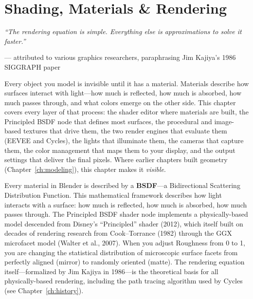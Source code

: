 
\chapter{Shading, Materials \& Rendering}
\label{ch:shading}

\begin{quotebox}
\itshape ``The rendering equation is simple. Everything else is
approximations to solve it faster.''

\upshape --- attributed to various graphics researchers,
paraphrasing Jim Kajiya's 1986 SIGGRAPH paper
\end{quotebox}

\vspace{1em}
Every object you model is invisible until it has a material.
Materials describe how surfaces interact with light---how much is
reflected, how much is absorbed, how much passes through, and what
colors emerge on the other side. This chapter covers every layer of
that process: the shader editor where materials are built, the
Principled BSDF node that defines most surfaces, the procedural and
image-based textures that drive them, the two render engines that
evaluate them (EEVEE and Cycles), the lights that illuminate them,
the cameras that capture them, the color management that maps them
to your display, and the output settings that deliver the final
pixels. Where earlier chapters built geometry
(Chapter~\ref{ch:modeling}), this chapter makes it \emph{visible}.

\begin{historynote}
Every material in Blender is described by a \textbf{BSDF}---a
Bidirectional Scattering Distribution Function. This mathematical
framework describes how light interacts with a surface: how much is
reflected, how much is absorbed, how much passes through. The
Principled BSDF shader node implements a physically-based model
descended from Disney's ``Principled'' shader (2012), which itself
built on decades of rendering research from Cook--Torrance (1982)
through the GGX microfacet model (Walter et al., 2007). When you
adjust Roughness from 0 to 1, you are changing the statistical
distribution of microscopic surface facets from perfectly aligned
(mirror) to randomly oriented (matte). The rendering equation
itself---formalized by Jim Kajiya in 1986---is the theoretical
basis for all physically-based rendering, including the path
tracing algorithm used by Cycles
(see Chapter~\ref{ch:history}).
\end{historynote}


